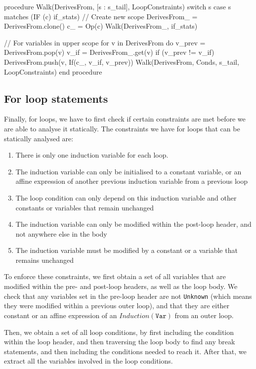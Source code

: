 \begin{sflisting}
  procedure Walk(DerivesFrom, [s : s_tail], LoopConstraints)
    switch s
      case s matches (IF (c) {if_stats})
        // Create new scope
        DerivesFrom_ = DerivesFrom.clone()
        c_ = Op(c)
        Walk(DerivesFrom_, if_stats)

        // For variables in upper scope
        for v in DerivesFrom do
          v_prev = DerivesFrom.pop(v)
          v_if = DerivesFrom_.get(v)
          if (v_prev != v_if)
            DerivesFrom.push(v, If(c_, v_if, v_prev))
        Walk(DerivesFrom, Conds, s_tail, LoopConstraints)
  end procedure 
\end{sflisting}

\subsection{For loop statements}

Finally, for loops, we have to first check if certain constraints are met before we are able to analyse it statically.
The constraints we have for loops that can be statically analysed are:
\begin{enumerate}
  \item There is only one induction variable for each loop.
  \item The induction variable can only be initialised to a constant variable, or an affine expression of another previous
        induction variable from a previous loop
  \item The loop condition can only depend on this induction variable and other constants or variables that remain unchanged
  \item The induction variable can only be modified within the post-loop header, and not anywhere else in the body
  \item The induction variable must be modified by a constant or a variable that remains unchanged
\end{enumerate}

To enforce these constraints, we first obtain a set of all variables that are modified within the pre- and post-loop
headers, as well as the loop body. We check that any variables set in the pre-loop header are not \texttt{Unknown} (which means they
were modified within a previous outer loop), and that they are either constant or an affine expression of an $Induction(\texttt{Var})$
from an outer loop.

Then, we obtain a set of all loop conditions, by first including the condition
within the loop header, and then traversing the loop body to find any break statements, and then including the
conditions needed to reach it. After that, we extract all the variables involved in the loop conditions.

